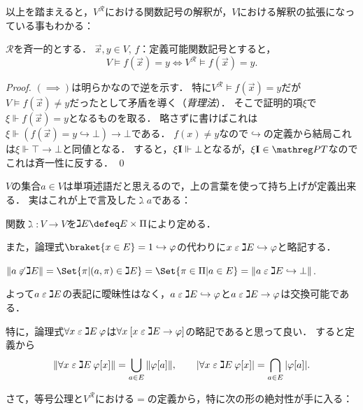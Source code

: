 \documentclass[realisability.tex]{subfiles}
\begin{document}
以上を踏まえると，$V^{\mathcal{R}}$における関数記号の解釈が，$V$における解釈の拡張になっている事もわかる：
\begin{lemma}\label{lem:func-abs}
 $\mathcal{R}$を斉一的とする．
 $\vec{x}, y \in V$, $f$：定義可能関数記号とすると，
 \[
  V \models f(\vec{x}) = y \iff V^{\mathcal{R}} \models f(\vec{x}) = y.
 \]
\end{lemma}
\begin{proof}
 $({\implies})$は明らかなので逆を示す．
 特に$V^\mathcal{R} \models f(\vec{x}) = y$だが$V \models f(\vec{x}) \neq y$だったとして矛盾を導く（\emph{背理法}）．
 そこで証明的項$\xi$で$\xi \Vdash f(\vec{x}) = y$となるものを取る．
 略さずに書けばこれは$\xi \Vdash \left(f(\vec{x}) = y \hookrightarrow \bot\right) \to \bot$である．
 $f(x) \neq y$なので$\hookrightarrow$の定義から結局これは$\xi \Vdash \top \to \bot$と同値となる．
 すると，$\xi \mathsf{\mathbf{I}} \Vdash \bot$となるが，$\xi \comb{I} \in \PT$なのでこれは斉一性に反する． \qed
\end{proof}

$V$の集合$a \in V$は単項述語だと思えるので，上の言葉を使って持ち上げが定義出来る．
実はこれが上で言及した$\gimel a$である：

\begin{definition}
 関数$\gimel : V \to V$を$\gimel E \defeq E \times \Pi$により定める．

 また，論理式$\braket{x \in E} = 1 \hookrightarrow \varphi$の代わりに$x \mathrel{\varepsilon} \gimel E \hookrightarrow \varphi$と略記する．
\end{definition}

\begin{remark}
 $\|a \strnin \gimel E\| = \Set{ \pi | (a, \pi) \in \gimel E} = \Set{ \pi \in \Pi | a \in E} = \| a \strin \gimel E \hookrightarrow \bot\|$.

 よって$a \mathrel{\varepsilon} \gimel E$の表記に曖昧性はなく，$a \mathrel{\varepsilon} \gimel E \hookrightarrow \varphi$と$a \mathrel{\varepsilon} \gimel E \to \varphi$は交換可能である．

 特に，論理式$\forall x \mathrel{\varepsilon} \gimel E \: \varphi$は$\forall x \: [ x \mathrel{\varepsilon} \gimel E \to \varphi]$の略記であると思って良い．
 すると定義から
 \[
  \left\| \forall x \mathrel{\varepsilon} \gimel E \: \varphi[x]\right\| = \bigcup_{a \in E} \|\varphi[a]\|, \qquad
  \left\lvert \forall x \mathrel{\varepsilon} \gimel E \: \varphi[x]\right\rvert = \bigcap_{a \in E} |\varphi[a]|.
 \]
\end{remark}

さて，等号公理と$V^{\mathcal{R}}$における$=$の定義から，特に次の形の絶対性が手に入る：
\end{document}
